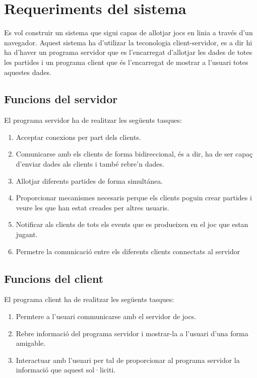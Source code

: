 

\section{Requeriments del sistema}

Es vol construir un sistema que sigui capas de allotjar jocs en linia a través d'un navegador. 
Aquest sistema ha d'utilizar la teconologia client-servidor, es a dir hi ha d'haver un programa servidor que es l'encarregat d'allotjar les dades de totes les partides i un programa client que és l'encarregat de mostrar a l'usuari totes aquestes dades. 
 

\subsection{Funcions del servidor}

El programa servidor ha de realitzar les següents tasques:

\begin{enumerate}
	\item{Acceptar conexions per part dels clients.}
	\item{Comunicarse amb els clients de forma bidireccional, és a dir, ha de ser capaç d'enviar dades als clients  i també rebre'n dades.}
	\item{Allotjar diferents partides de forma simultánea.}
	\item{Proporcionar mecanismes necesaris perque els clients poguin crear partides i veure les que han estat creades per altres usuaris.}
	\item{Notificar als clients de tots els events que es produeixen en el joc que estan jugant.}
	\item{Permetre la comunicació entre els diferents clients connectats al servidor}	
\end{enumerate}

\subsection{Funcions del client}

El programa client ha de realitzar les següents tasques: 

\begin{enumerate}
	\item{Permtere a l'usuari communicarse amb el servidor de jocs.}
	\item{Rebre informació del programa servidor i mostrar-la a l'usuari d'una forma amigable.}
	\item{Interactuar amb l'usuari per tal de proporcionar al programa servidor la informació que aquest sol·liciti.}	
\end{enumerate}


